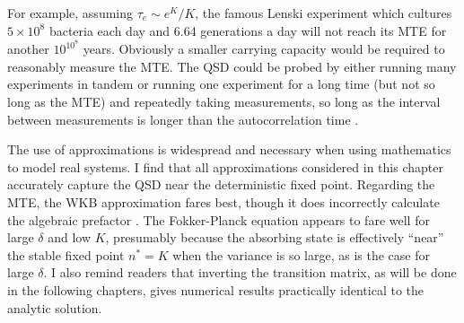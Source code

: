 For example, assuming $\tau_e \sim e^K/K$, the famous Lenski experiment \cite{Lenski1991} which cultures $5\times 10^8$ bacteria each day and 6.64 generations a day will not reach its MTE for another $10^{10^8}$ years. Obviously a smaller carrying capacity would be required to reasonably measure the MTE. 
The QSD could be probed by either running many experiments in tandem or running one experiment for a long time (but not so long as the MTE) and repeatedly taking measurements, so long as the interval between measurements is longer than the autocorrelation time \cite{Hanggi1990}. %

The use of approximations is widespread and necessary when using mathematics to model real systems. 
I find that all approximations considered in this chapter accurately capture the QSD near the deterministic fixed point. %
Regarding the MTE, the WKB approximation fares best, though it does incorrectly calculate the algebraic prefactor \cite{Assaf2010,Badali2019a,Badali2019b}. %
The Fokker-Planck equation appears to fare well for large $\delta$ and low $K$, presumably because the absorbing state is effectively ``near'' the stable fixed point $n^*=K$ when the variance is so large, as is the case for large $\delta$. 
I also remind readers that inverting the transition matrix, as will be done in the following chapters, gives numerical results practically identical to the analytic solution. 

